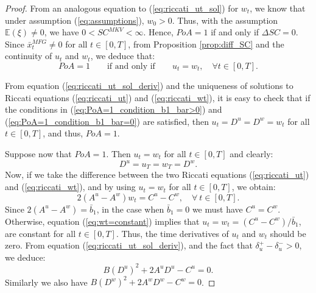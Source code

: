 \documentclass[11pt]{article}
\begin{document}
\begin{proof}
	From an analogous equation to (\ref{eq:riccati_ut_sol}) for $w_t$, we know that under assumption (\ref{eq:assumptions}), $w_0>0$. Thus, with the assumption $\mathbb{E}(\xi) \neq 0$, we have $0 < SC^{MKV} < \infty$. Hence, $PoA =1$ if and only if $\Delta SC = 0$. Since $\bar{x}_t^{MFG} \neq 0$ for all $t \in [0,T]$, from Proposition \ref{prop:diff_SC} and the continuity of $u_t$ and $w_t$, we deduce that:
	\begin{equation*}
		PoA = 1 \qquad \text{if and only if} \qquad u_t = w_t, \quad \forall  t \in [0,T]. 
	\end{equation*}
	
	From equation (\ref{eq:riccati_ut_sol_deriv}) and the uniqueness of solutions to Riccati equations (\ref{eq:riccati_ut}) and (\ref{eq:riccati_wt}), it is easy to check that if the conditions in (\ref{eq:PoA=1_condition_b1_bar>0}) and (\ref{eq:PoA=1_condition_b1_bar=0}) are satisfied, then $u_t=D^u=D^w = w_t$ for all $ t\in [0,T]$, and thus, $PoA = 1$.	
	
	Suppose now that $PoA =1$. Then $u_t = w_t$ for all $t \in [0,T]$ and clearly:
	$$D^u = u_T = w_T = D^w.$$
	Now, if we take the difference between the two Riccati equations (\ref{eq:riccati_ut}) and (\ref{eq:riccati_wt}), and by using $u_t = w_t$ for all $t \in [0,T]$, we obtain:
	\begin{equation}
		2 (A^u - A^w) w_t = C^u - C^w, \quad \forall \  t \in [0,T].
	\label{eq:wt=constant}
	\end{equation}
	Since $2(A^u - A^w) = \bar{b}_1$, in the case when $\bar{b}_1 =0$ we must have $C^u = C^w$. Otherwise, equation (\ref{eq:wt=constant}) implies that $u_t = w_t = (C^u - C^w) / \bar{b}_1 $, are constant for all $t \in [0,T]$. Thus, the time derivatives of $u_t$ and $w_t$ should be zero. From equation (\ref{eq:riccati_ut_sol_deriv}), and the fact that $\delta_u^+ - \delta_u^- > 0$, we deduce: 
	$$ B (D^{u})^2 + 2 A^u D^u - C^u = 0.$$
	Similarly we also have $B (D^{w})^2 + 2 A^w D^w - C^w = 0$. 
	
	
\end{proof}
\end{document}
